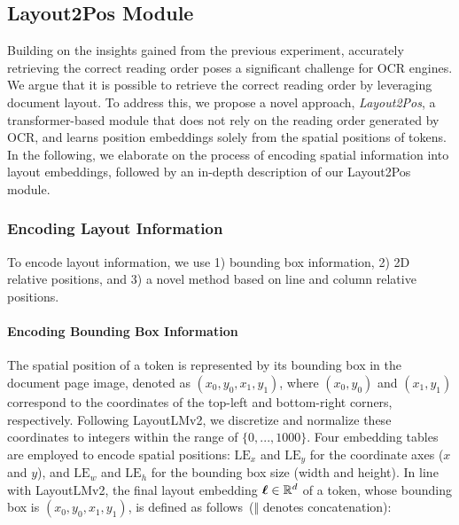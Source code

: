\subsection{Layout2Pos Module}

Building on the insights gained from the previous experiment, accurately retrieving the correct reading order poses a significant challenge for \ac{OCR} engines. We argue that it is possible to retrieve the correct reading order by leveraging document layout. To address this, we propose a novel approach, \textit{Layout2Pos}, a transformer-based module that does not rely on the reading order generated by \ac{OCR}, and learns position embeddings solely from the spatial positions of tokens. In the following, we elaborate on the process of encoding spatial information into layout embeddings, followed by an in-depth description of our Layout2Pos module.


\subsubsection{Encoding Layout Information}

To encode layout information, we use 1) bounding box information, 2) 2D relative positions, and 3) a novel method based on line and column relative positions.

\paragraph{Encoding Bounding Box Information} 

The spatial position of a token is represented by its bounding box in the document page image, denoted as $(x_0, y_0, x_1, y_1)$, where $(x_0, y_0)$ and $(x_1, y_1)$ correspond to the coordinates of the top-left and bottom-right corners, respectively. Following LayoutLMv2, we discretize and normalize these coordinates to integers within the range of $\{0, ..., 1000\}$. Four embedding tables are employed to encode spatial positions: $\text{LE}_x$ and $\text{LE}_y$ for the coordinate axes ($x$ and $y$), and $\text{LE}_w$ and $\text{LE}_h$ for the bounding box size (width and height). In line with LayoutLMv2, the final layout embedding $\boldsymbol{\ell} \in \mathbb{R}^{d}$ of a token, whose bounding box is $(x_0, y_0, x_1, y_1)$, is defined as follows~($\mathbin\Vert$ denotes concatenation):

